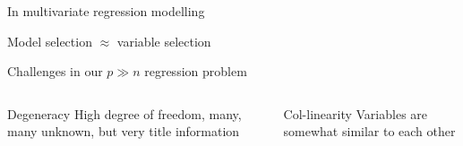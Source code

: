 \documentclass[
  ignorenonframetext,
  aspectratio=169]{beamer}
\begin{document}
\begin{frame}{In multivariate regression modelling}
\protect\hypertarget{in-multivariate-regression-modelling}{}
\Large

Model selection \(\approx\) variable selection
\end{frame}

\begin{frame}{Challenges in our \(p\gg n\) regression problem}
\protect\hypertarget{challenges-in-our-pgg-n-regression-problem}{}
\begin{columns}[T]
\begin{column}{.45\textwidth}
\begin{block}{Degeneracy}
\protect\hypertarget{degeneracy}{}
High degree of freedom, many, many unknown, but very title information
\end{block}

\scriptsize


\normalsize
\end{column}

\begin{column}{.45\textwidth}
\begin{block}{Col-linearity}
\protect\hypertarget{col-linearity}{}
Variables are somewhat similar to each other
\end{block}

\scriptsize

\end{column}
\end{columns}
\end{frame}
\end{document}
